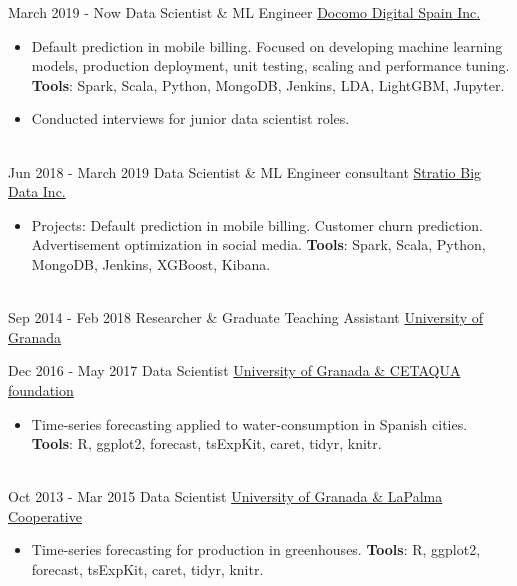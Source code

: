 \documentclass[letterpaper]{twentysecondcv} %
\begin{document}
\begin{twenty} %

\twentyitem
    	{March 2019 - }
		{Now}
        {Data Scientist \& ML Engineer}
        {\href{https://www.docomodigital.com/}{Docomo Digital Spain Inc.}}
        {}
        {\begin{itemize}
        \item Default prediction in mobile billing. Focused on developing machine learning models, production deployment,  unit testing, scaling and performance tuning. \textbf{Tools}: Spark, Scala, Python, MongoDB, Jenkins, LDA, LightGBM, Jupyter. 
        \item Conducted interviews for junior data scientist roles.
        \end{itemize}}
        \\
\twentyitem
    	{Jun 2018 -}
		{March 2019}
        {Data Scientist \& ML Engineer consultant}
        {\href{http://www.stratio.com/}{Stratio Big Data Inc.}}
        {}
        {\begin{itemize}
        \item Projects: Default prediction in mobile billing. Customer churn prediction. Advertisement optimization in social media. \textbf{Tools}: Spark, Scala, Python, MongoDB, Jenkins, XGBoost, Kibana. 
        \end{itemize}}
        \\
\twentyitem
    	{Sep 2014 -}
		{Feb 2018}
        {Researcher \& Graduate Teaching Assistant}
        {\href{http://www.ugr.es/}{University of Granada}}
        {}        %

 \twentyitem
    	{Dec 2016 -}
		{May 2017}
        {Data Scientist}
        {\href{http://www.cetaqua.com/en/cetaqua}{University of Granada \& CETAQUA foundation}}
        {}
        {\begin{itemize}
        	\item Time-series forecasting applied to water-consumption in Spanish cities. \textbf{Tools}: R, ggplot2, forecast, tsExpKit, caret, tidyr, knitr.
        \end{itemize}}
        
\\
 \twentyitem
    	{Oct 2013 -}
		{Mar 2015}
        {Data Scientist}
        {\href{http://www.granadalapalma.com/}{University of Granada \& LaPalma Cooperative}}
        {}
        {\begin{itemize}
        	\item Time-series forecasting for production in greenhouses. \textbf{Tools}: R, ggplot2, forecast, tsExpKit, caret, tidyr, knitr.
        \end{itemize}}
        

\end{twenty}
\end{document}
